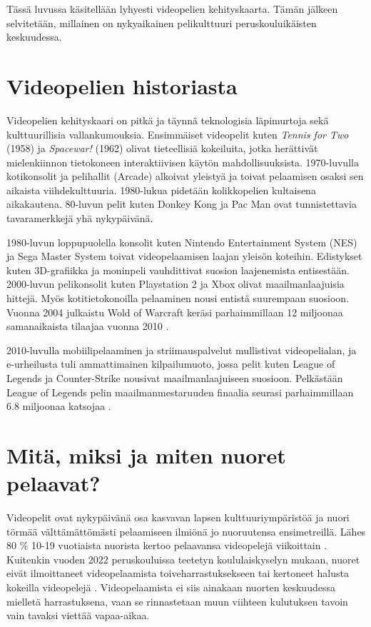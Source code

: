 \documentclass[utf8,bachelor]{gradu3}
\begin{document}
Tässä luvussa käsitellään lyhyesti videopelien kehityskaarta. Tämän jälkeen selvitetään, millainen on nykyaikainen pelikulttuuri peruskouluikäisten keskuudessa.

\section{Videopelien historiasta}

Videopelien kehityskaari on pitkä ja täynnä teknologisia läpimurtoja sekä kulttuurillisia vallankumouksia. Ensimmäiset videopelit kuten \textit{Tennis for Two} (1958) ja  \textit{Spacewar!} (1962) olivat tieteellisiä kokeiluita, jotka herättivät mielenkiinnon tietokoneen interaktiivisen käytön mahdollisuuksista. 1970-luvulla kotikonsolit ja pelihallit (Arcade) alkoivat yleistyä ja toivat pelaamisen osaksi sen aikaista viihdekulttuuria. 1980-lukua pidetään kolikkopelien kultaisena aikakautena. 80-luvun pelit kuten Donkey Kong ja Pac Man ovat tunnistettavia tavaramerkkejä yhä nykypäivänä. \parencite {stanton2015brief}

1980-luvun loppupuolella konsolit kuten Nintendo Entertainment System (NES) ja Sega Master System toivat videopelaamisen laajan yleisön koteihin. Edistykset kuten 3D-grafiikka ja moninpeli vauhdittivat suosion laajenemista entisestään. 2000-luvun pelikonsolit kuten Playstation 2 ja Xbox olivat maailmanlaajuisia hittejä. Myös kotitietokonoilla pelaaminen nousi entistä suurempaan suosioon.  Vuonna 2004 julkaistu Wold of Warcraft keräsi parhaimmillaan 12 miljoonaa samanaikaista tilaajaa vuonna 2010 \parencite{Wowlost}. \parencite {stanton2015brief}

2010-luvulla mobiilipelaaminen ja striimauspalvelut mullistivat videopelialan, ja e-urheilusta tuli ammattimainen kilpailumuoto, jossa pelit kuten League of Legends ja Counter-Strike nousivat maailmanlaajuiseen suosioon. Pelkästään League of Legends pelin maailmanmestaruuden finaalia seurasi parhaimmillaan 6.8 miljoonaa katsojaa \parencite{esportchart}.  

\section{Mitä, miksi ja miten nuoret pelaavat?}

Videopelit ovat nykypäivänä osa kasvavan lapsen kulttuuriympäristöä ja nuori törmää välttämättömästi pelaamiseen ilmiönä jo nuoruutensa ensimetreillä. Lähes 80 \% 10-19 vuotiaista nuorista kertoo pelaavansa videopelejä viikoittain \parencite{kinnunen2022pelaajabarometri}. Kuitenkin vuoden 2022 peruskouluissa teetetyn koululaiskyselyn mukaan, nuoret eivät ilmoittaneet videopelaamista toiveharrastuksekseen tai kertoneet halusta kokeilla videopelejä \parencite{koululaiskysely2022}. Videopelaamista ei siis ainakaan nuorten keskuudessa mielletä harrastuksena, vaan se rinnastetaan muun viihteen kulutuksen tavoin vain tavaksi viettää vapaa-aikaa.  
\end{document}
